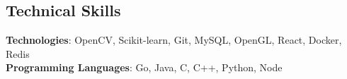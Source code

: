 \documentclass[margin,line]{res}
\begin{document}
\begin{resume}
  \vspace*{-3.5mm}

\section{\sc Technical Skills}

  {\bf Technologies}: OpenCV, Scikit-learn, Git, MySQL, OpenGL, React, Docker, Redis \\
  {\bf Programming Languages}: Go, Java, C, C++, Python, Node

\begin{comment}
\section{\sc References}

  \begin{tabular}{@{}p{1.85in}p{2in}p{2in}}

  {\bf Prof. Vineeth N \newline Balasubramanian } & {\bf Prof. Ramakrishna \newline Upadrasta} \\
        {\it Assistant Professor} & {\it Assistant Professor} \\
        {\it IIT Hyderabad} & {\it IIT Hyderabad} \\
        {\it Hyderabad, India} & {\it Hyderabad, India} \\
        {\it vineethnb@iith.ac.in} & {\it ramakrishna@iith.ac.in} \\

  \end{tabular}
\end{comment}

\end{resume}
\end{document}
